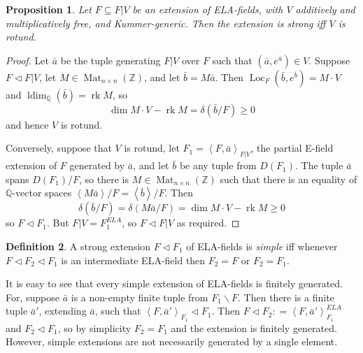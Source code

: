 \documentclass[12pt]{amsart}
\newtheorem{prop}{Proposition}[section]
\theoremstyle{definition}
\newtheorem{defn}[prop]{Definition}
\begin{document}
\begin{prop}\label{rotund prop}
  Let $F {\subseteq} F|V$ be an extension of ELA-fields, with $V$ additively and multiplicatively free, and {Kummer-generic}. Then the extension is strong iff $V$ is rotund.
\end{prop}
\begin{proof}
  Let ${{\ensuremath{\bar{a}}}}$ be the tuple generating $F|V$ over $F$ such that $({{\ensuremath{\bar{a}}}},e^{{\ensuremath{\bar{a}}}}) \in V$.
  Suppose $F {\ensuremath{\lhd}} F|V$, let $M \in \operatorname{Mat}_{n{\ensuremath{\times}} n}({\ensuremath{\mathbb{Z}}})$, and let
  $\bar{b} = M\bar{a}$. Then $\operatorname{Loc}_F(\bar{b},e^{\bar{b}}) = M\cdot
  V$ and $\operatorname{ldim}_{\ensuremath{\mathbb{Q}}}(\bar{b}) = \operatorname{rk} M$, so 
  \[\dim M \cdot V - \operatorname{rk} M = \delta(\bar{b}/F) {\ensuremath{\geqslant}} 0\]
  and hence $V$ is rotund.

  Conversely, suppose that $V$ is rotund, let $F_1 = {\ensuremath{\left\langle {F,{{\ensuremath{\bar{a}}}}} \right\rangle}}_{F|V}$, the partial E-field extension of $F$ generated by ${{\ensuremath{\bar{a}}}}$, and let $\bar{b}$ be any
  tuple from $D(F_1)$. The tuple $\bar{a}$ spans $D(F_1)/F$, so
  there is $M \in \operatorname{Mat}_{n{\ensuremath{\times}} n}({\ensuremath{\mathbb{Z}}})$ such that there is an equality of ${\ensuremath{\mathbb{Q}}}$-vector spaces ${\ensuremath{\left\langle {M\bar{a}} \right\rangle}}/F
  = {\ensuremath{\left\langle {\bar{b}} \right\rangle}}/F$. Then 
  \[\delta(\bar{b}/F) = \delta(M\bar{a}/F) = \dim M\cdot V - \operatorname{rk} M
  {\ensuremath{\geqslant}} 0\] so $F {\ensuremath{\lhd}} F_1$. But $F|V = F_1^{ELA}$, so $F {\ensuremath{\lhd}} F|V$ as required.
\end{proof}

\begin{defn}
  A strong extension $F {\ensuremath{\lhd}} F_1$ of ELA-fields is \emph{simple} iff
  whenever $F {\ensuremath{\lhd}} F_2 {\ensuremath{\lhd}} F_1$ is an intermediate ELA-field then $F_2 = F$ or $F_2 = F_1$.
\end{defn}
It is easy to see that every simple extension of ELA-fields is finitely generated. For, suppose ${{\ensuremath{\bar{a}}}}$ is a non-empty finite tuple from $F_1 {\ensuremath{\smallsetminus}} F$. Then there is a finite tuple ${{\ensuremath{\bar{a}}}}'$, extending ${{\ensuremath{\bar{a}}}}$, such that ${\ensuremath{\left\langle {F,{{\ensuremath{\bar{a}}}}'} \right\rangle}}_{F_1} {\ensuremath{\lhd}} F_1$. Then $F {\ensuremath{\lhd}} F_2 {\mathrel{\mathop:}=} {\ensuremath{\left\langle {F,{{\ensuremath{\bar{a}}}}'} \right\rangle}}^{ELA}_{F_1}$ and $F_2 {\ensuremath{\lhd}} F_1$, so by simplicity $F_2 = F_1$ and the extension is finitely generated. However, simple extensions are not necessarily generated by a single element.
\end{document}
